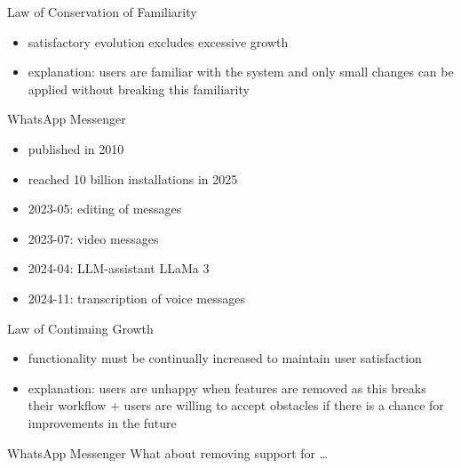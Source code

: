 \begin{frame}{\insertsubsection}
	\begin{fancycolumns}
		\begin{definition}{Law of Conservation of Familiarity\mysource{\lehmanslaws}}
			\begin{itemize}
				\item satisfactory evolution excludes excessive growth %
				\item explanation: users are familiar with the system and only small changes can be applied without breaking this familiarity
			\end{itemize}
		\end{definition}
		\begin{example}{WhatsApp Messenger}
			\begin{itemize}
				\item published in 2010
				\item reached 10 billion installations in 2025
				\item 2023-05: editing of messages
				\item 2023-07: video messages
				\item 2024-04: LLM-assistant LLaMa 3
				\item 2024-11: transcription of voice messages
			\end{itemize}
		\end{example}
		\nextcolumn
		\begin{definition}{Law of Continuing Growth\mysource{\lehmanslaws}}
			\begin{itemize}
				\item functionality must be continually increased to maintain user satisfaction %
				\item explanation: users are unhappy when features are removed as this breaks their workflow + users are willing to accept obstacles if there is a chance for improvements in the future
			\end{itemize}
		\end{definition}
		\begin{example}{WhatsApp Messenger}
			What about removing support for \ldots
			

\end{example}
\end{fancycolumns}
\end{frame}
